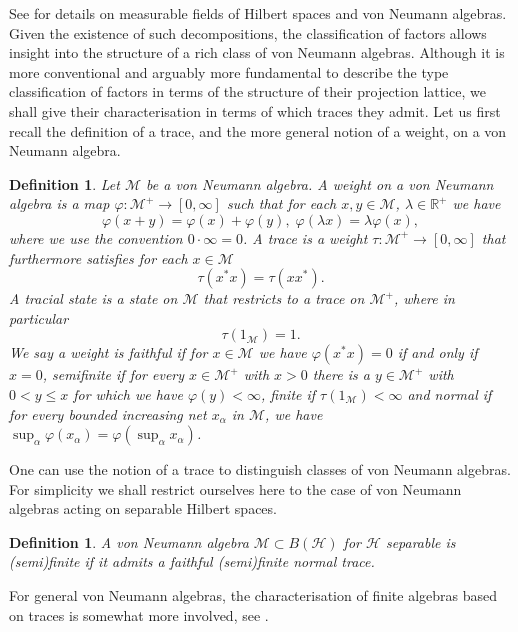 \documentclass[sn-mathphys-num]{sn-jnl}%
\newcommand{\RR}{\mathbb{R}}
\newcommand{\HH}{\mathcal{H}}
\newcommand{\MM}{\mathcal{M}}
\numberwithin{equation}{section}
\theoremstyle{thmstyleone}%
\theoremstyle{thmstyletwo}%
\theoremstyle{thmstylethree}%
\newtheorem{definition}[theorem]{Definition}%
\begin{document}
    See \cite[Ch.\ IV.8]{Takesaki2001} for details on measurable fields of Hilbert spaces and von Neumann algebras. Given the existence of such decompositions, the classification of factors allows insight into the structure of a rich class of von Neumann algebras. Although it is more conventional and arguably more fundamental to describe the type classification of factors in terms of the structure of their projection lattice, we shall give their characterisation in terms of which traces they admit. Let us first recall the definition of a trace, and the more general notion of a weight, on a von Neumann algebra.
    \begin{definition}
        \label{def:weight_trace}
        Let $\mathcal{M}$ be a von Neumann algebra. A \textup{weight} on a von Neumann algebra is a map $\varphi:\MM^+\to [0,\infty]$ such that for each $x,y\in\MM$, $\lambda\in\RR^+$ we have
        \begin{equation}
            \varphi(x+y)=\varphi(x)+\varphi(y),\;\varphi(\lambda x)=\lambda\varphi(x),
        \end{equation}
        where we use the convention $0\cdot\infty=0$. A \textup{trace} is a weight $\tau:\MM^+\to [0,\infty]$ that furthermore satisfies for each $x\in\mathcal{M}$
        \begin{equation}
            \tau(x^*x)=\tau(xx^*).
        \end{equation}
        A \textup{tracial state} is a state on $\MM$ that restricts to a trace on $\MM^+$, where in particular
        \begin{equation}
            \tau(1_{\MM})=1.
        \end{equation}
        We say a weight is \textup{faithful} if for $x\in\MM$ we have $\varphi(x^*x)=0$ if and only if $x=0$, \textup{semifinite} if for every $x\in\MM^+$ with $x>0$ there is a $y\in\MM^+$ with $0<y\leq x$ for which we have $\varphi(y)<\infty$, \textup{finite} if $\tau(1_\MM)<\infty$ and \textup{normal} if for every bounded increasing net $x_\alpha$ in $\MM$, we have $\sup_{\alpha}\varphi(x_\alpha)=\varphi(\sup_\alpha x_\alpha)$.
    \end{definition}
    One can use the notion of a trace to distinguish classes of von Neumann algebras. For simplicity we shall restrict ourselves here to the case of von Neumann algebras acting on separable Hilbert spaces.
    \begin{definition}
        A von Neumann algebra $\MM\subset B(\HH)$ for $\HH$ separable is \textup{(semi)finite} if it admits a faithful (semi)finite normal trace.
    \end{definition}
    For general von Neumann algebras, the characterisation of finite algebras based on traces is somewhat more involved, see \cite[Ch.~V.2]{Takesaki2001}.
    
\end{document}
